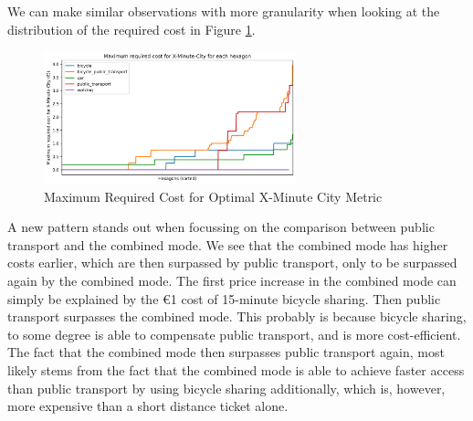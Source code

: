 We can make similar observations with more granularity when looking at the distribution of the required cost in Figure \ref{fig:maximum_required_cost_for_x_minute_city}.
\begin{figure}
  \begin{center}
    \includegraphics[width=0.65\textwidth]{Figures/results/cost/maximum_required_cost_for_x_minute_city}
  \end{center}
  \caption{Maximum Required Cost for Optimal X-Minute City Metric}
  \label{fig:maximum_required_cost_for_x_minute_city}
\end{figure}
A new pattern stands out when focussing on the comparison between public transport and the combined mode.
We see that the combined mode has higher costs earlier, which are then surpassed by public transport, only to be surpassed again by the combined mode.
The first price increase in the combined mode can simply be explained by the \euro{1} cost of 15-minute bicycle sharing.
Then public transport surpasses the combined mode. 
This probably is because bicycle sharing, to some degree is able to compensate public transport, and is more cost-efficient.
The fact that the combined mode then surpasses public transport again, most likely stems from the fact that the combined mode is able to achieve faster access than public transport by using bicycle sharing additionally, which is, however, more expensive than a short distance ticket alone.

